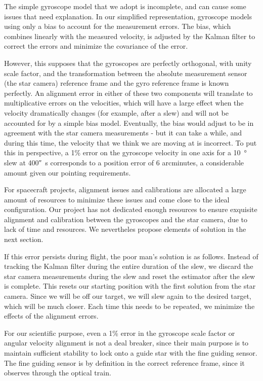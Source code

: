 The simple gyroscope model that we adopt is incomplete, and can cause some issues that need explanation. In our simplified representation, gyroscope models using only a bias to account for the measurement errors. The bias, which combines linearly with the measured velocity, is adjusted by the Kalman filter to correct the errors and minimize the covariance of the error.

However, this supposes that the gyroscopes are perfectly orthogonal, with unity scale factor, and the transformation between the absolute measurement sensor (the star camera) reference frame and the gyro reference frame is known perfectly. An alignment error in either of these two components will translate to multiplicative errors on the velocities, which will have a large effect when the velocity dramatically changes (for example, after a slew) and will not be accounted for by a simple bias model. Eventually, the bias would adjust to be in agreement with the star camera measurements - but it can take a while, and during this time, the velocity that we think we are moving at is incorrect. To put this in perspective, a 1\% error on the gyroscope velocity in one axis for a \SI{10}{\degree} slew at \ang{;;400}\si{\per\second} corresponds to a position error of 6 arcminutes, a considerable amount given our pointing requirements.

For spacecraft projects, alignment issues and calibrations are allocated a large amount of resources to minimize these issues and come close to the ideal configuration. Our project has not dedicated enough resources to ensure exquisite alignment and calibration between the gyroscopes and the star camera, due to lack of time and resources. We nevertheles propose elements of solution in the next section.

If this error persists during flight, the poor man's solution is as follows. Instead of tracking the Kalman filter during the entire duration of the slew, we discard the star camera measurements during the slew and reset the estimator after the slew is complete. This resets our starting position with the first solution from the star camera. Since we will be off our target, we will slew again to the desired target, which will be much closer. Each time this needs to be repeated, we minimize the effects of the alignment errors.

For our scientific purpose, even a 1\% error in the gyroscope scale factor or angular velocity alignment is not a deal breaker, since their main purpose is to maintain sufficient stability to lock onto a guide star with the fine guiding sensor. The fine guiding sensor is by definition in the correct reference frame, since it observes through the optical train. 


